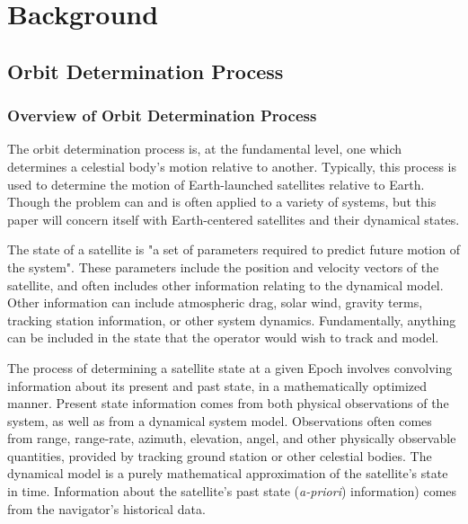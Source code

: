 \documentclass[12pt,a4paper,oneside]{article}
\numberwithin{equation}{section}   		%
\begin{document}
\newpage
\tableofcontents{}
\listoffigures{}


\newpage
\section{Background}

\subsection{Orbit Determination Process}
\label{sec:OD Process}


\subsubsection{Overview of Orbit Determination Process}
\label{sec:OD sub Overview}
The orbit determination process is, at the fundamental level, one which determines a celestial body's motion relative to another. Typically, this process is used to determine the motion of Earth-launched satellites relative to Earth. Though the problem can and is often applied to a variety of systems, but this paper will concern itself with Earth-centered satellites and their dynamical states. 

The state of a satellite is "a set of parameters required to predict future motion of the system"\cite{tapley2004statistical}. These parameters include the position and velocity vectors of the satellite, and often includes other information relating to the dynamical model. Other information can include atmospheric drag, solar wind, gravity terms, tracking station information, or other system dynamics. Fundamentally, anything can be included in the state that the operator would wish to track and model. 

The process of determining a satellite state at a given Epoch involves convolving information about its present and past state, in a mathematically optimized manner. Present state information comes from both physical observations of the system, as well as from a dynamical system model. Observations often comes from range, range-rate, azimuth, elevation, angel, and other physically observable quantities, provided by tracking ground station or other celestial bodies. The dynamical model is a purely mathematical approximation of the satellite's state in time. Information about the satellite's past state (\emph{a-priori}) information) comes from the navigator's historical data. 
\end{document}
